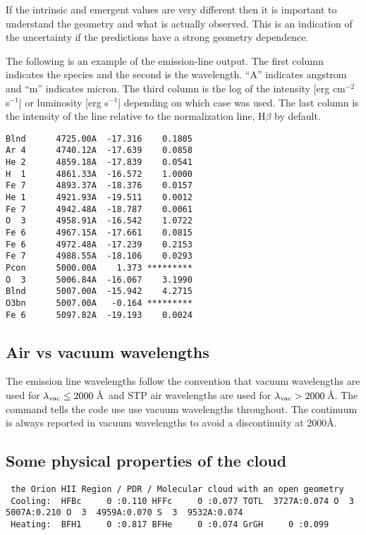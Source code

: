 If the intrinsic and emergent values are very different then it is
important to understand the geometry and what is actually observed.
This
is an indication of the uncertainty if the predictions have a strong
geometry dependence.

The following is an example of the emission-line output.
The first column indicates the species and the second is the wavelength.
``A'' indicates angstrom and ``m'' indicates micron.
The third column is the log of the intensity [erg cm$^{-2}$ s$^{-1}$] or luminosity [erg s$^{-1}$]
depending on which case was used.
The last column is the intensity of the line relative to the normalization line, H$\beta$ by default.
\begin{verbatim}
Blnd      4725.00A  -17.316    0.1805
Ar 4      4740.12A  -17.639    0.0858
He 2      4859.18A  -17.839    0.0541
H  1      4861.33A  -16.572    1.0000
Fe 7      4893.37A  -18.376    0.0157
He 1      4921.93A  -19.511    0.0012
Fe 7      4942.48A  -18.787    0.0061
O  3      4958.91A  -16.542    1.0722
Fe 6      4967.15A  -17.661    0.0815
Fe 6      4972.48A  -17.239    0.2153
Fe 7      4988.55A  -18.106    0.0293
Pcon      5000.00A    1.373 *********
O  3      5006.84A  -16.067    3.1990
Blnd      5007.00A  -15.942    4.2715
O3bn      5007.00A   -0.164 *********
Fe 6      5097.82A  -19.193    0.0024
\end{verbatim}

\subsection{Air vs vacuum wavelengths}
The emission line wavelengths follow the convention that vacuum wavelengths
are used for $\lambda_{\rm vac} \le 2000$\,\AA\ and STP air wavelengths are used
for $\lambda_{\rm vac} > 2000$\,\AA.
The  command tells the code use use vacuum wavelengths throughout.
The continuum is always reported in vacuum wavelengths to avoid 
a discontinuity at 2000\AA.

\subsection{Some physical properties of the cloud}

{\setverbatimfontsize{\tiny}
\begin{verbatim}
 the Orion HII Region / PDR / Molecular cloud with an open geometry
 Cooling:  HFBc     0 :0.110 HFFc     0 :0.077 TOTL  3727A:0.074 O  3  5007A:0.210 O  3  4959A:0.070 S  3  9532A:0.074
 Heating:  BFH1     0 :0.817 BFHe     0 :0.074 GrGH     0 :0.099
\end{verbatim}
}

